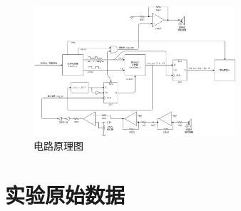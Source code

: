 \documentclass[a4paper, twocolumn]{ctexart}
\begin{document}
\begin{figure}[H]
    \centering
    \includegraphics[width=7.5cm]{../assets/电路原理图.png}
    \caption{电路原理图}
    \label{fig:sch}
\end{figure}

\section{实验原始数据}

\begin{figure}[H]
    \centering
\end{figure}
\end{document}
